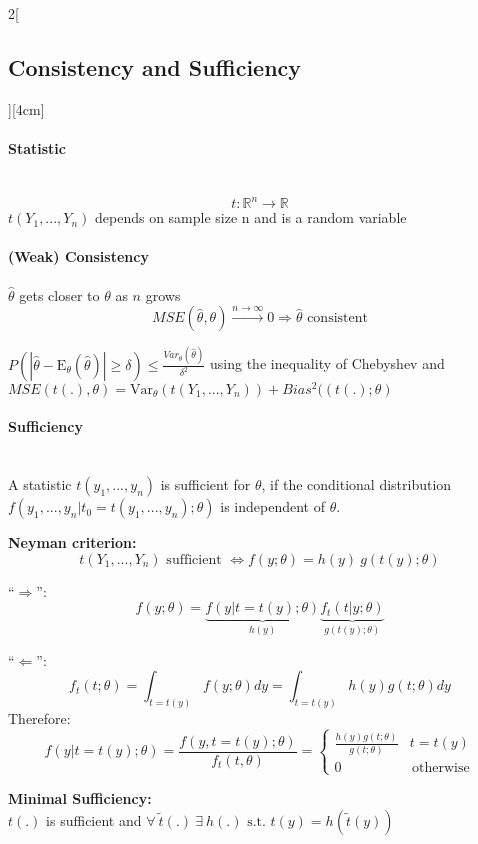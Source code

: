 \documentclass[8pt]{extarticle}
\begin{document}
\begin{multicols}{2}[\subsection{Consistency and Sufficiency}][4cm]

\paragraph{Statistic} \ \\
$$t: \mathbb{R}^n \rightarrow \mathbb{R}$$
$t(Y_1, ..., Y_n)$ depends on sample size n and is a random variable

\paragraph{(Weak) Consistency} $\hat{\theta}$ gets closer to $\theta$ as $n$ grows
$$MSE(\hat{\theta},\theta) \overset{n\rightarrow\infty}{\longrightarrow} 0 \Rightarrow \hat{\theta} \text{ consistent}$$

\begin{Proof}
$P(|\hat{\theta} - \mathrm{E}_{\theta}(\hat{\theta})| \geq \delta) \leq \frac{Var_\theta(\hat{\theta})}{\delta^2}$ using the inequality of Chebyshev
and $MSE(t(.), \theta) = \mathrm{Var}_\theta(t(Y_1,...,Y_n)) + Bias^2((t(.); \theta)$
\end{Proof}

\paragraph{Sufficiency} \ \\
\noindent A statistic $t(y_1,...,y_n)$ is sufficient for $\theta$, if the conditional distribution $f(y_1,...,y_n|t_0 = t(y_1,...,y_n);\theta)$ is independent of $\theta$. \vspace{0.5em}

\textbf{Neyman criterion:}
$$t(Y_1,...,Y_n) \text{ sufficient } \Leftrightarrow f(y;\theta) = h(y)\:g(t(y);\theta)$$
\begin{Proof}
``$\Rightarrow$'':
$$f(y;\theta) = \underbrace{f(y|t {=} t(y);\theta)}_{h(y)} \underbrace{f_t(t|y;\theta)}_{g(t(y);\theta)}$$

\noindent ``$\Leftarrow$'':
$$f_t(t;\theta) = \int_{t=t(y)} f(y;\theta)dy = \int_{t=t(y)} h(y) g(t;\theta)dy$$
\indent Therefore:
$$f\left(y|t{=}t(y);\theta\right) = \frac{f(y,t{=}t(y);\theta)}{f_t(t,\theta)}
= \begin{cases}
\frac{h(y)g(t;\theta)}{g(t;\theta)} & t=t(y) \\
0 & \, \text{otherwise}
\end{cases}$$
\end{Proof}

\textbf{Minimal Sufficiency:} \ \\
$t(.)$ is sufficient and $\forall\: \tilde{t}(.)\: \exists\: h(.) \text{ s.t. } t(y) = h(\tilde{t}(y))$



\end{multicols}
\end{document}
